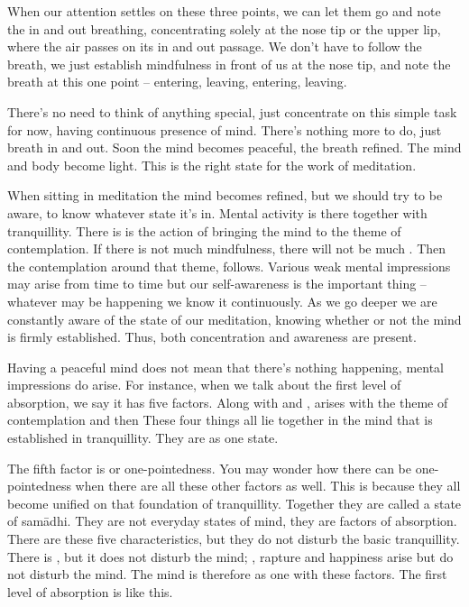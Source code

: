 When our attention settles on these three points, we can let them go and note the in and out breathing, concentrating solely at the nose tip or the upper lip, where the air passes on its in and out passage. We don't have to follow the breath, we just establish mindfulness in front of us at the nose tip, and note the breath at this one point -- entering, leaving, entering, leaving.

There's no need to think of anything special, just concentrate on this simple task for now, having continuous presence of mind. There's nothing more to do, just breath in and out. Soon the mind becomes peaceful, the breath refined. The mind and body become light. This is the right state for the work of meditation.

When sitting in meditation the mind becomes refined, but we should try to be aware, to know whatever state it's in. Mental activity is there together with tranquillity. There is   is the action of bringing the mind to the theme of contemplation. If there is not much mindfulness, there will not be much . Then  the contemplation around that theme, follows. Various weak mental impressions may arise from time to time but our self-awareness is the important thing -- whatever may be happening we know it continuously. As we go deeper we are constantly aware of the state of our meditation, knowing whether or not the mind is firmly established. Thus, both concentration and awareness are present.

Having a peaceful mind does not mean that there's nothing happening, mental impressions do arise. For instance, when we talk about the first level of absorption, we say it has five factors. Along with  and ,   arises with the theme of contemplation and then  These four things all lie together in the mind that is established in tranquillity. They are as one state.

The fifth factor is  or one-pointedness. You may wonder how there can be one-pointedness when there are all these other factors as well. This is because they all become unified on that foundation of tranquillity. Together they are called a state of sam\=adhi. They are not everyday states of mind, they are factors of absorption. There are these five characteristics, but they do not disturb the basic tranquillity. There is , but it does not disturb the mind; , rapture and happiness arise but do not disturb the mind. The mind is therefore as one with these factors. The first level of absorption is like this.

